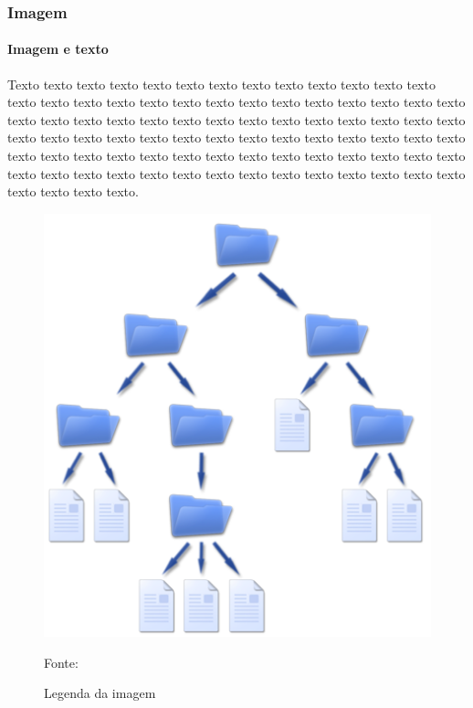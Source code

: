 \documentclass[aspectratio=169]{beamer}
\begin{document}
	\begin{frame}
		\frametitle{Imagem}
		\framesubtitle{Imagem e texto}
		
		\begin{minipage}[H]{.5\textwidth}
			Texto texto texto texto texto texto texto texto texto texto texto texto texto texto texto texto texto texto texto texto texto texto texto texto texto texto texto texto texto texto texto texto texto texto texto texto texto texto texto texto texto texto texto texto texto texto texto texto texto texto texto texto texto texto texto texto texto texto texto texto texto texto texto texto texto texto texto texto texto texto texto texto texto texto texto texto texto texto texto texto texto texto texto texto texto texto texto.	
		\end{minipage}
		\hfill
		\begin{minipage}[H]{.45\textwidth}
			\begin{figure}
				\centering
				\caption{Legenda da imagem}
				
				\includegraphics[width=.25\linewidth]{sa.png}
				
				\footnotesize{Fonte: }
				\label{figtextimg}
			\end{figure}  
		\end{minipage}
	\end{frame}
	
\end{document}
